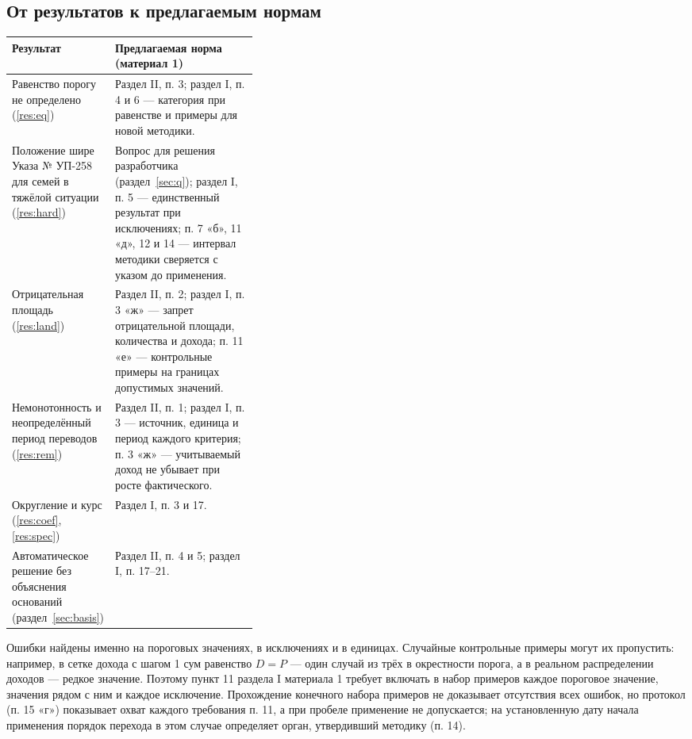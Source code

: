 \documentclass[14pt,a4paper]{extarticle}
\begin{document}
\subsection{От результатов к предлагаемым нормам}
\begingroup\fontsize{12bp}{14.4bp}\selectfont
\begin{longtable}{L{0.36\linewidth} L{\tabcolsep}}
\toprule
Результат & Предлагаемая норма (материал 1)\\\midrule\endhead
Равенство порогу не определено (\ref{res:eq}) & Раздел II, п. 3; раздел I, п. 4 и 6 — категория при равенстве и примеры для новой методики.\\\midrule
Положение шире Указа № УП-258 для семей в тяжёлой ситуации (\ref{res:hard}) & Вопрос для решения разработчика (раздел~\ref{sec:q}); раздел I, п. 5 — единственный результат при исключениях; п. 7 «б», 11 «д», 12 и 14 — интервал методики сверяется с указом до применения.\\\midrule
Отрицательная площадь (\ref{res:land}) & Раздел II, п. 2; раздел I, п. 3 «ж» — запрет отрицательной площади, количества и дохода; п. 11 «е» — контрольные примеры на границах допустимых значений.\\\midrule
Немонотонность и неопределённый период переводов (\ref{res:rem}) & Раздел II, п. 1; раздел I, п. 3 — источник, единица и период каждого критерия; п. 3 «ж» — учитываемый доход не убывает при росте фактического.\\\midrule
Округление и курс (\ref{res:coef}, \ref{res:spec}) & Раздел I, п. 3 и 17.\\\midrule
Автоматическое решение без объяснения оснований (раздел~\ref{sec:basis}) & Раздел II, п. 4 и 5; раздел I, п. 17–21.\\
\bottomrule
\end{longtable}\endgroup

Ошибки найдены именно на пороговых значениях, в исключениях и в единицах. Случайные контрольные примеры могут их пропустить: например, в сетке дохода с шагом 1 сум равенство $D=P$ — один случай из трёх в окрестности порога, а в реальном распределении доходов — редкое значение. Поэтому пункт 11 раздела I материала 1 требует включать в набор примеров каждое пороговое значение, значения рядом с ним и каждое исключение. Прохождение конечного набора примеров не доказывает отсутствия всех ошибок, но протокол (п. 15 «г») показывает охват каждого требования п. 11, а при пробеле применение не допускается; на установленную дату начала применения порядок перехода в этом случае определяет орган, утвердивший методику (п. 14).
\end{document}
